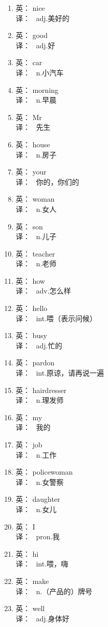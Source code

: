 {\begin{multicols}{2}
\begin{enumerate}
\item 英： nice \\ 译： \ adj.美好的
\item 英： good \\ 译： \ adj.好
\item 英： car \\ 译： \ n.小汽车
\item 英： morning \\ 译： \ n.早晨
\item 英： Mr \\ 译： \ 先生
\item 英： house \\ 译： \ n.房子
\item 英： your \\ 译： \ 你的，你们的
\item 英： woman \\ 译： \ n.女人
\item 英： son \\ 译： \ n.儿子
\item 英： teacher \\ 译： \ n.老师
\item 英： how \\ 译： \ adv.怎么样
\item 英： hello \\ 译： \ int.喂（表示问候）
\item 英： busy \\ 译： \ adj.忙的
\item 英： pardon \\ 译： \ int.原谅，请再说一遍
\item 英： hairdresser \\ 译： \ n.理发师
\item 英： my \\ 译： \ 我的
\item 英： job \\ 译： \ n.工作
\item 英： policewoman \\ 译： \ n.女警察
\item 英： daughter \\ 译： \ n.女儿
\item 英： I \\ 译： \ pron.我
\item 英： hi \\ 译： \ int.喂，嗨
\item 英： make \\ 译： \ n.（产品的）牌号
\item 英： well \\ 译： \ adj.身体好

\end{enumerate}
\end{multicols}}
